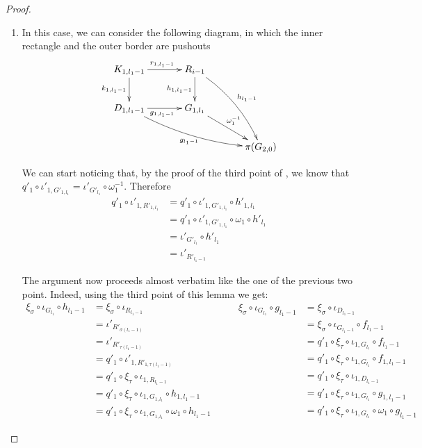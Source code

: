 \begin{proof}
\begin{enumerate}
			\item In this case, we can consider the following diagram, in which the inner rectangle and the outer border are pushouts
		\[\xymatrix@C=35pt{K_{1,l_1-1}\ar[r]^{r_{1,l_1-1}} \ar[d]_{k_{1,l_1-1}}& R_{i-1} \ar[d]_{h_{1,l_1-1}} \ar@/^.3cm/[ddr]^{h_{l_1-1}}\\ D_{1,l_1-1} \ar[r]_{g_{1,l_1-1}} \ar@/_.3cm/[drr]_{g_{l_1-1}}& G_{1,l_1} \ar[dr]^{\omega_1^{-1}}\\ &&\pi(G_{2,0})}\] 
		
		\iffalse 
	\[	\xi_\sigma \circ \iota_{G_{l_1}}=q'_1 \circ \xi_{\tau} \circ \iota_{1, G_{l_1}}\circ \omega_1\]
	\fi 
		We can start noticing that, by the proof of  the third point of , we know that  $q'_1\circ \iota'_{1, G'_{1,l_1}}=\iota'_{G'_{l_1}} \circ \omega_1^{-1}$. Therefore
		\begin{align*}q'_1\circ \iota'_{1, R'_{1,l_1}}&=q'_1\circ \iota'_{1, G'_{1,l_1}}\circ  h'_{1, l_1}\\&=q'_1\circ \iota'_{1, G'_{1,l_1}}\circ \omega_1 \circ  h'_{ l_1}\\&= \iota'_{G'_{l_1}}\circ h'_{l_1}\\&=\iota'_{R'_{l_1-1}}
		\end{align*}
		
		The argument now proceeds almost verbatim like the one of the previous two point. Indeed, using the third point of this lemma we get:
		\[\begin{split}
			\xi_\sigma \circ \iota_{G_{l_1}}\circ h_{l_1-1}&=  \xi_\sigma\circ \iota_{R_{l_1-1}}\\&=\iota'_{R'_{\sigma(l_1-1)}}\\&=\iota'_{R'_{\tau(l_1-1)}}\\&=q'_1\circ \iota'_{1, R'_{1,\tau(l_1-1)}}\\&=q'_1\circ \xi_{\tau}\circ \iota_{1, R_{l_1-1}}\\&=q'_1\circ \xi_{\tau} \circ \iota_{1, G_{1,l_1}}\circ h_{1, l_1-1}\\&=q'_1\circ \xi_\tau \circ \iota_{1, G_{1, l_1}} \circ \omega_1 \circ  h_{l_1-1}			\end{split}  \qquad  		\begin{split}
			\xi_\sigma \circ \iota_{G_{l_1}}\circ g_{l_1-1}&=\xi_{\sigma}\circ \iota_{D_{l_1-1}}\\&=\xi_{\sigma}\circ \iota_{G_{l_1-1}} \circ f_{l_1-1}\\&=q'_1 \circ \xi_{\tau} \circ \iota_{1, G_{l_1}} \circ f_{l_1-1}\\&=q'_1 \circ \xi_{\tau} \circ \iota_{1, G_{l_1}} \circ f_{1, {l_1}-1}\\&=q'_1 \circ \xi_{\tau} \circ \iota_{1, D_{{l_1}-1}}\\&=q'_1 \circ \xi_{\tau} \circ \iota_{1, G_{l_1}}\circ g_{1, l_1-1}\\&=q'_1 \circ \xi_{\tau} \circ \iota_{1, G_{l_1}}\circ \omega_1\circ g_{l_1-1}
			\end{split}\]
			

\end{enumerate}
\end{proof}
